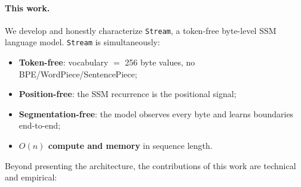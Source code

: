 \documentclass[11pt]{article}
\newcommand{\Stream}{\texttt{Stream}}
\begin{document}
\paragraph{This work.}
We develop and honestly characterize \Stream{}, a token-free byte-level SSM
language model. \Stream{} is simultaneously:
\begin{itemize}
  \item \textbf{Token-free}: vocabulary $=$ 256 byte values, no BPE/WordPiece/SentencePiece;
  \item \textbf{Position-free}: the SSM recurrence is the positional signal;
  \item \textbf{Segmentation-free}: the model observes every byte and learns
        boundaries end-to-end;
  \item \textbf{$O(n)$ compute and memory} in sequence length.
\end{itemize}

Beyond presenting the architecture, the contributions of this work are
technical and empirical:
\end{document}
